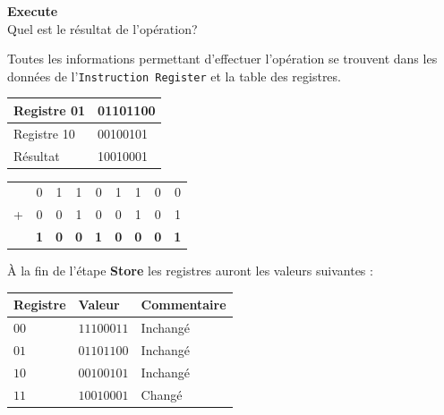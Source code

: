 \begin{Exercice}[10 minutes] \textbf{Execute}\\
    Quel est le résultat de l'opération?
    \begin{conseil}
        Toutes les informations permettant d'effectuer l'opération se trouvent dans les données de l'\lstinline{Instruction Register} et la table des registres.
    \end{conseil}
    \begin{solution}

    \begin{tabular}{| C{0.13\textwidth} | C{0.13\textwidth} |} 
        \hline
        Registre 01 & 01101100\\ [0.5ex] 
        \hline
        Registre 10 & 00100101\\ [0.5ex] 
        \hline
        Résultat & 10010001\\ [0.5ex] 
        \hline

    \end{tabular}
        \begin{tabular}{ccccccccc}
            & 0 & 1 & 1 & 0 & 1 & 1 & 0 & 0 \\
          + & 0 & 0 & 1 & 0 & 0 & 1 & 0 & 1 \\
          \hline
            & \textbf{1} & \textbf{0} & \textbf{0} & \textbf{1} & \textbf{0} & \textbf{0} & \textbf{0} & \textbf{1} \\
          \end{tabular}

    \medskip
    À la fin de l'étape \textbf{Store} les registres auront les valeurs suivantes : 
    \medskip
    \begin{tabular}{| C{0.13\textwidth} | C{0.13\textwidth} | C{0.13\textwidth}|} 
    \hline
    \textbf{Registre} & \textbf{Valeur} & \textbf{Commentaire} \\ [1ex]
    \hline
    $00$ & $11100011$ & Inchangé\\ [0.5ex] 
    \hline
    $01$ & $01101100$ & Inchangé\\ [0.5ex] 
    \hline
    $10$ & $00100101$ & Inchangé\\ [0.5ex] 
    \hline
    $11$ & $10010001$ & Changé\\ [0.5ex]
    \hline
    \end{tabular}
    \end{solution}
\end{Exercice}



